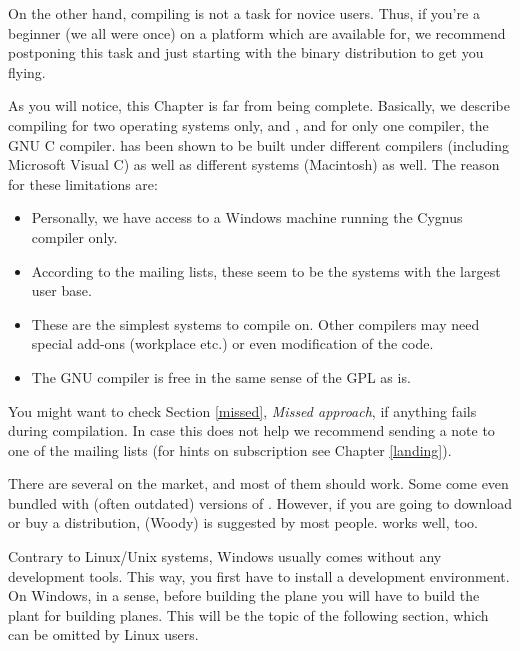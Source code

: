 On the other hand, compiling \FlightGear{} is not a task for novice users. Thus, if
you're a beginner (we all were once) on a platform which  are available
for, we recommend postponing this task and just starting with the binary
distribution to get you flying.

As you will notice, this Chapter is far from being complete. Basically, we describe
compiling for two operating systems only,  and , and for only
one compiler, the GNU C compiler. \FlightGear{} has been shown to be built under
different compilers (including Microsoft Visual C) as well as different systems
(Macintosh) as well. The reason for these limitations are:

\begin{itemize}
\item Personally, we have access to a Windows machine running the Cygnus compiler only.
\item According to the mailing lists, these seem to be the systems with the largest user base.
\item These are the simplest systems to compile \FlightGear{} on. Other compilers may need special
add-ons (workplace etc.) or even modification of the code.
\item The GNU compiler is free in the same sense of the GPL as \FlightGear{} is.
\end{itemize}

You might want to check Section \ref{missed}, \textit{Missed approach},
if anything fails during compilation. In case this does not help we
recommend sending a note to one of the mailing lists (for hints on
subscription see Chapter \ref{landing}).

There are several  on the market, and most
of them should work. Some come even bundled with (often outdated)
versions of \FlightGear{}$\!$. However, if you are going to download or
buy a distribution,  (Woody) is suggested by most people.
 works well, too.

Contrary to Linux/Unix systems, Windows usually comes without any development tools. This
way, you first have to install a development environment. On Windows, in a sense, before
building the plane you will have to build the plant for building planes. This will be the
topic of the following section, which can be omitted by Linux users.


